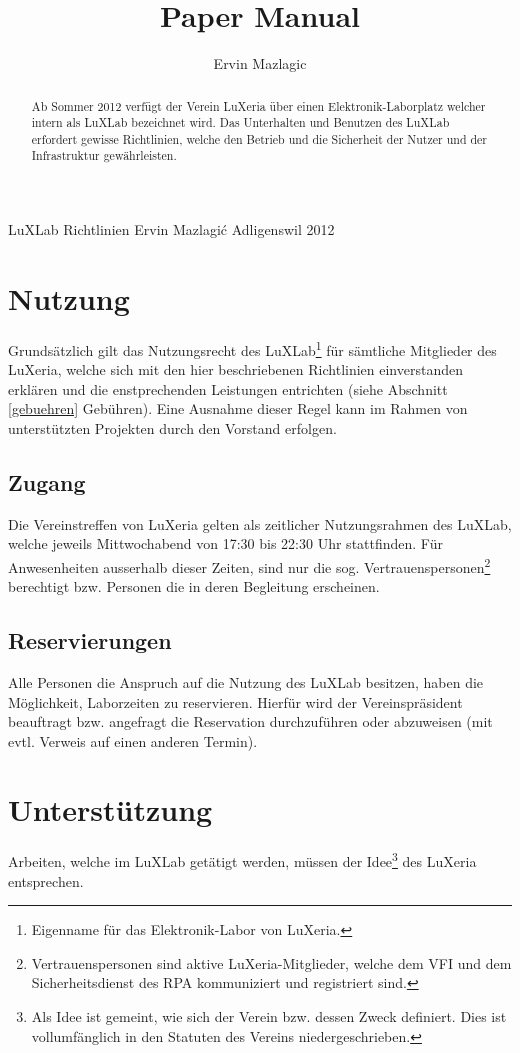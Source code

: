 \documentclass[a4paper,
               10pt,
               fleqn]{article}
\author{Ervin Mazlagic}
\title{Paper Manual}
\begin{document}
         {LuXLab Richtlinien}
         {Ervin Mazlagi\'c}
         {Adligenswil}
         {2012}
         
\begin{abstract}
\noindent
Ab Sommer 2012 verfügt der Verein LuXeria über einen Elektronik-Laborplatz
welcher intern als LuXLab bezeichnet wird. Das Unterhalten und Benutzen 
des LuXLab erfordert gewisse Richtlinien, welche den Betrieb und
die Sicherheit der Nutzer und der Infrastruktur gewährleisten.
\end{abstract}

\newpage

\tableofcontents
\newpage


\section{Nutzung}
Grundsätzlich gilt das Nutzungsrecht des LuXLab\footnote{
    Eigenname für das Elektronik-Labor von LuXeria.} 
für sämtliche Mitglieder des LuXeria, welche sich mit den hier beschriebenen Richtlinien 
einverstanden erklären und die enstprechenden Leistungen entrichten 
(siehe Abschnitt \ref{gebuehren} Gebühren). Eine Ausnahme dieser Regel kann im Rahmen 
von unterstützten Projekten durch den Vorstand erfolgen.

\subsection{Zugang}
Die Vereinstreffen von LuXeria gelten als zeitlicher Nutzungsrahmen 
des LuXLab, welche jeweils Mittwochabend von 17:30 bis 22:30 Uhr 
stattfinden. Für Anwesenheiten ausserhalb dieser Zeiten, sind nur die sog. Vertrauenspersonen\footnote{Vertrauenspersonen sind aktive LuXeria-Mitglieder,
    welche dem VFI und dem Sicherheitsdienst des
    RPA kommuniziert und registriert sind.}
berechtigt bzw. Personen die in deren Begleitung erscheinen.

\subsection{Reservierungen}
Alle Personen die Anspruch auf die Nutzung des LuXLab besitzen, haben die
Möglichkeit, Laborzeiten zu reservieren. Hierfür wird der Vereinspräsident 
beauftragt bzw. angefragt die Reservation durchzuführen oder abzuweisen
(mit evtl. Verweis auf einen anderen Termin).

\section{Unterstützung}
Arbeiten, welche im LuXLab getätigt werden, müssen der Idee\footnote{
     Als Idee ist gemeint, wie sich der Verein bzw. dessen Zweck definiert.
     Dies ist vollumfänglich in den Statuten des Vereins niedergeschrieben.}
des LuXeria entsprechen. 
\end{document}
